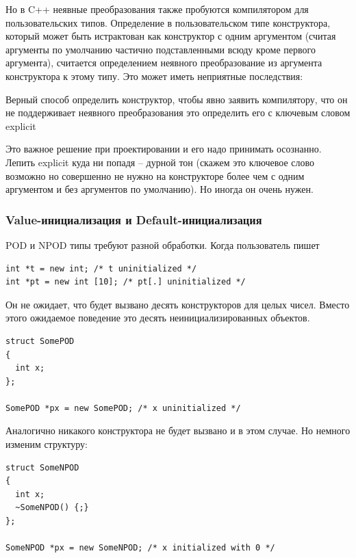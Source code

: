 \documentclass[a4paper,12pt,oneside]{article}
\begin{document}
Но в C++ неявные преобразования также пробуются компилятором для пользовательских типов. Определение в пользовательском типе конструктора, который может быть истрактован как конструктор с одним аргументом (считая аргументы по умолчанию частично подставленными всюду кроме первого аргумента), считается определением неявного преобразование из аргумента конструктора к этому типу. Это может иметь неприятные последствия:



Верный способ определить конструктор, чтобы явно заявить компилятору, что он не поддерживает неявного преобразования это определить его с ключевым словом explicit



Это важное решение при проектировании и его надо принимать осознанно. Лепить explicit куда ни попадя -- дурной тон (скажем это ключевое слово возможно но совершенно не нужно на конструкторе более чем с одним аргументом и без аргументов по умолчанию). Но иногда он очень нужен.

\subsubsection{Value-инициализация и Default-инициализация}

POD и NPOD типы требуют разной обработки. Когда пользователь пишет

\begin{lstlisting}
int *t = new int; /* t uninitialized */
int *pt = new int [10]; /* pt[.] uninitialized */
\end{lstlisting}

Он не ожидает, что будет вызвано десять конструкторов для целых чисел. Вместо этого ожидаемое поведение это десять неинициализированных объектов.

\begin{lstlisting}
struct SomePOD
{
  int x;
};

SomePOD *px = new SomePOD; /* x uninitialized */
\end{lstlisting}

Аналогично никакого конструктора не будет вызвано и в этом случае. Но немного изменим структуру:

\begin{lstlisting}
struct SomeNPOD
{
  int x;
  ~SomeNPOD() {;}
};

SomeNPOD *px = new SomeNPOD; /* x initialized with 0 */
\end{lstlisting}
\end{document}
